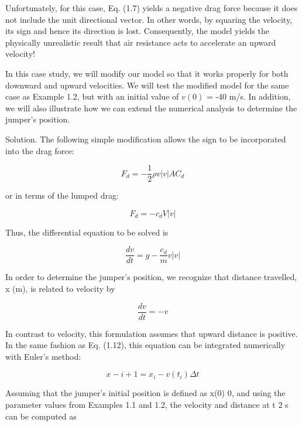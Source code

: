 \documentclass[../main.tex]{subfiles}
\begin{document}
Unfortunately, for this case, Eq. (1.7) yields a negative drag force because it does not
include the unit directional vector. In other words, by squaring the velocity, its sign and
hence its direction is lost. Consequently, the model yields the physically unrealistic result
that air resistance acts to accelerate an upward velocity!


In this case study, we will modify our model so that it works properly for both downward
and upward velocities. We will test the modified model for the same case as Example 1.2, but
with an initial value of $v(0)$ = -40 m/s. In addition, we will  also illustrate how we can extend
the numerical analysis to determine the jumper's position.


Solution. The following simple modification allows the sign to be incorporated into
the drag force:

\begin{equation}
	\tag{1.19}
	F_d=-\dfrac{1}{2}\rho v|v|AC_d
\end{equation}

or in terms of the lumped drag:

\begin{equation}
	\tag{1.20}
	F_d=-c_dV|v|
\end{equation}

Thus, the differential equation to be solved is

\begin{equation}
	\tag{1.21}
	\dfrac{dv}{dt}= g - \dfrac{c_d}{m}v|v|
\end{equation}

In order to determine the jumper's position, we recognize that distance travelled,
x (m), is related to velocity by


\begin{equation}
	\tag{1.22}
	\dfrac{dv}{dt}= -v
\end{equation}

In contrast to velocity, this formulation assumes that upward distance is positive. In the
same fashion as Eq. (1.12), this equation can be integrated numerically with Euler's
method:

\begin{equation}
	\tag{1.23}
	x-{i+1}=x_i-v(t_i)\Delta t
\end{equation}

Assuming that the jumper's initial position is defined as x(0)  0, and using the parameter values
 from Examples 1.1 and 1.2, the velocity and distance at t  2 s can be computed as
\end{document}
